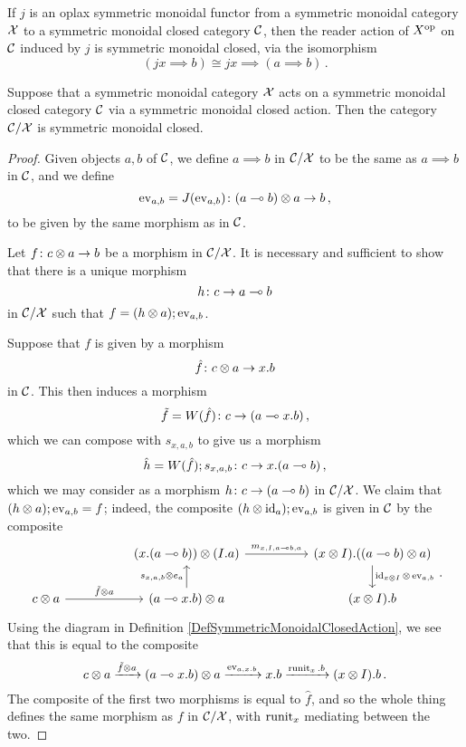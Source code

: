 \begin{example}
  If $j$ is an oplax symmetric monoidal functor from a symmetric monoidal category $\mathcal X$ to a symmetric monoidal closed category ${\mathcal{C}}$, then the reader action of $X^{\mathrm{op}}$ on ${\mathcal{C}}$ induced by $j$ is symmetric monoidal closed, via the isomorphism
  \[
    (jx \implies b) \cong jx \implies (a \implies b)\,.
    \]
\end{example}

\begin{proposition}
  Suppose that a symmetric monoidal category $\mathcal X$ acts on a symmetric monoidal closed category ${\mathcal{C}}$ via a symmetric monoidal closed action.  
  Then the category ${\mathcal{C}}/\mathcal X$ is symmetric monoidal closed.
\end{proposition}
\begin{proof}
  Given objects $a,b$ of ${\mathcal{C}}$, we define $a\implies b$ in ${\mathcal{C}}/\mathcal X$ to be the same as $a\implies b$ in ${\mathcal{C}}$, and we define
  \[
    \operatorname{ev}_{a,b} = J(\operatorname{ev}_{a,b}) \colon (a\multimap b)\otimes a \to b\,,
    \]
  to be given by the same morphism as in ${\mathcal{C}}$.

  Let $f \colon c \otimes a \to b$ be a morphism in ${\mathcal{C}}/\mathcal X$.  
  It is necessary and sufficient to show that there is a unique morphism
  \[
    h \colon c \to a \multimap b
    \]
  in ${\mathcal{C}}/\mathcal X$ such that $f = (h\otimes a);\operatorname{ev}_{a,b}$.

  Suppose that $f$ is given by a morphism
  \[
    \hat{f} \colon c \otimes a \to x.b
    \]
  in ${\mathcal{C}}$.  
  This then induces a morphism
  \[
    \tilde{f} = W(\hat{f}) \colon c \to (a \multimap x.b)\,,
    \]
  which we can compose with $s_{x,a,b}$ to give us a morphism
  \[
    \hat{h} = W(\hat{f});s_{x,a,b} \colon c \to x.(a\multimap b)\,,
    \]
  which we may consider as a morphism $h\colon c \to (a\multimap b)$ in ${\mathcal{C}}/\mathcal X$.  
  We claim that $(h\otimes a);\operatorname{ev}_{a,b}=f$; indeed, the composite $(h\otimes \operatorname{id}_a);\operatorname{ev}_{a,b}$ is given in ${\mathcal{C}}$ by the composite
  \[
    \begin{tikzcd}[column sep=50pt]
        & (x.(a\implies b)) \tensor (I.a) \arrow[r, "{m_{x,I,a\implies b,a}}"]
          & (x \tensor I).((a\implies b)\tensor a) \arrow[d, "{\id_{x\tensor I}\tensor \ev_{a,b}}"] \\
      c \tensor a \arrow[r, "\tilde{f}\tensor a"]
        & (a \implies x.b)\tensor a \arrow[u, "{s_{x,a,b}\tensor e_a}"]
          & (x\tensor I).b
    \end{tikzcd}\,.
    \]
  Using the diagram in Definition \ref{DefSymmetricMonoidalClosedAction}, we see that this is equal to the composite
  \[
    c\otimes a \xrightarrow{\tilde{f}\otimes a}
    (a \multimap x.b) \otimes a \xrightarrow{\operatorname{ev}_{a,x.b}}
    x.b \xrightarrow{\operatorname{runit}_x.b}
    (x\otimes I).b\,.
    \]
  The composite of the first two morphisms is equal to $\hat{f}$, and so the whole thing defines the same morphism as $f$ in ${\mathcal{C}}/\mathcal X$, with $\operatorname{runit}_x$ mediating between the two.


\end{proof}
